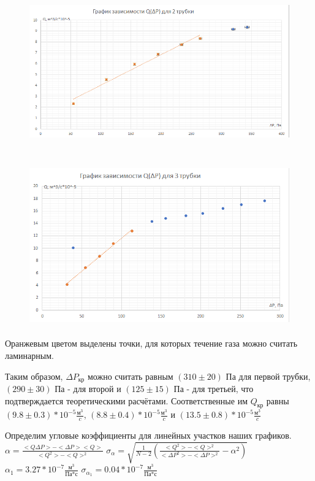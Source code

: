 \documentclass[12pt,a4paper]{article}
\begin{document}
\begin{figure}[H]
\centering
\includegraphics[width=14cm, height=7cm]{1.3.3_gr_2}
\end{figure}
\begin{figure}[H]
\centering
\includegraphics[width=14cm, height=7cm]{1.3.3_gr_3}
\end{figure}
Оранжевым цветом выделены точки, для которых течение газа можно считать ламинарным. 
\par Таким образом, $\Delta{P}_{\text{кр}}$ можно считать равным $(310 \pm 20)$ Па для первой трубки, $(290 \pm 30)$ Па - для второй и $(125 \pm 15)$ Па - для третьей, что подтверждается теоретическими расчётами. Соответственные им $Q_{\text{кр}}$ равны $(9.8 \pm 0.3)*10^{-5} \frac{\text{м}^3}{c}$, $(8.8 \pm 0.4)*10^{-5} \frac{\text{м}^3}{c}$ и $(13.5 \pm 0.8)*10^{-5} \frac{\text{м}^3}{c}$ 
\par Определим угловые коэффициенты для линейных участков наших графиков. \hfill \break
$\alpha=\frac{<Q\Delta{P}>-<\Delta{P}><Q>}{<Q^2>-<Q>^2}$ \;\;\;\;\;\;\; $\sigma_{\alpha}=\sqrt{\frac{1}{N-2}(\frac{<{Q}^2>-<Q>^2}{<{\Delta{P}}^2>-<\Delta{P}>^2}-{\alpha}^2)}$ \hfill \break
$\alpha_{1}=3.27*10^{-7}\frac{\text{м}^3}{\text{Па*с}}$  \;\;\;\;\;\;\;\;\; $\sigma_{\alpha_{1}}=0.04*10^{-7}\frac{\text{м}^3}{\text{Па*с}}$  \hfill \break
\end{document}
